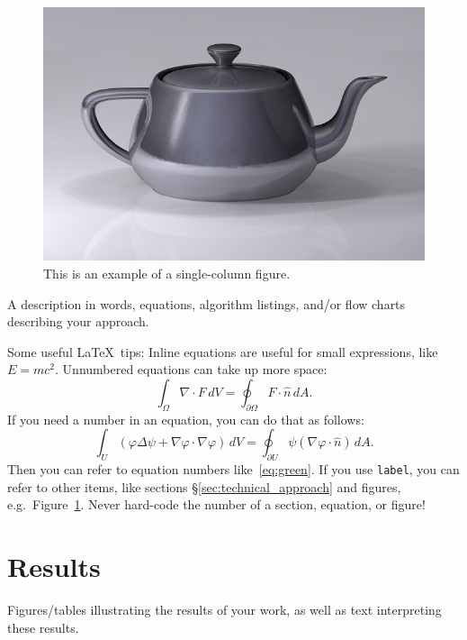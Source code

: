 \documentclass{6838publ}
\begin{document}
\begin{figure}[t]
\centering
 \includegraphics[width=.75\linewidth]{teapot}
\caption{This is an example of a single-column figure.}\label{fig:teapot}
\end{figure}

A description in words, equations, algorithm listings, and/or flow charts describing your approach.  

Some useful \LaTeX\ tips:  Inline equations are useful for small expressions, like $E=mc^2$.  Unnumbered equations can take up more space:
$$\int_\Omega \nabla\cdot F\,dV= \oint_{\partial\Omega} F\cdot\hat n\,dA.$$
If you need a number in an equation, you can do that as follows:
\begin{equation}\label{eq:green}
\int_U (\varphi\Delta\psi + \nabla\varphi\cdot\nabla\varphi)\,dV=\oint_{\partial U}\psi(\nabla\varphi\cdot\hat n)\,dA.
\end{equation}
Then you can refer to equation numbers like~\eqref{eq:green}.  If you use \texttt{label}, you can refer to other items, like sections \S\ref{sec:technical_approach} and figures, e.g.\ Figure~\ref{fig:teapot}.  Never hard-code the number of a section, equation, or figure!

\section{Results}

Figures/tables illustrating the results of your work, as well as text interpreting these results.



\end{document}
